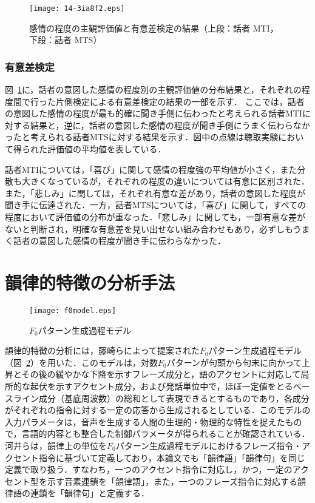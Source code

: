\documentclass[japanese]{jnlp_1.3b}
\begin{document}
\begin{figure}[b]
\begin{center}
    \texttt{[image: 14-3ia8f2.eps]}
\end{center}
\caption{感情の程度の主観評価値と有意差検定の結果（上段：話者 MTI，下段：話者 MTS）}
\label{mos}
\end{figure}

    \subsubsection{有意差検定}
図~\ref{mos}に，話者の意図した感情の程度別の主観評価値の分布結果と，それぞれの程度間で行った片側検定による有意差検定の結果の一部を示す．
ここでは，話者の意図した感情の程度が最も的確に聞き手側に伝わったと考えられる話者MTIに対する結果と，逆に，話者の意図した感情の程度が聞き手側にうまく伝わらなかったと考えられる話者MTSに対する結果を示す．図中の点線は聴取実験において得られた評価値の平均値を表している．

話者MTIについては，「喜び」に関して感情の程度強の平均値が小さく，また分散も大きくなっているが，それぞれの程度の違いについては有意に区別された．また，「悲しみ」に関しては，それぞれ有意な差があり，話者の意図した程度が聞き手に伝達された．一方，話者MTSについては，「喜び」に関して，すべての程度において評価値の分布が重なった．「悲しみ」に関しても，一部有意な差がないと判断され，明確な有意差を見い出せない組み合わせもあり，必ずしもうまく話者の意図した感情の程度が聞き手に伝わらなかった．


\section{韻律的特徴の分析手法}\label{ln}


\begin{figure}[b]
\begin{center}
    \texttt{[image: f0model.eps]}
\end{center}
\caption{$F_0$パターン生成過程モデル}
\label{model}
\end{figure}

韻律的特徴の分析には，藤崎らによって提案された$F_0$パターン生成過程モデル（図~\ref{model}）\cite{Fuji3}を用いた．このモデルは，対数$F_0$パターンが句頭から句末に向かって上昇とその後の緩やかな下降を示すフレーズ成分と，語のアクセントに対応して局所的な起伏を示すアクセント成分，および発話単位中で，ほぼ一定値をとるベースライン成分（基底周波数）の総和として表現できるとするものであり，各成分がそれぞれの指令に対する一定の応答から生成されるとしている．このモデルの入力パラメータは，音声を生成する人間の生理的・物理的な特性を捉えたもので，言語的内容とも整合した制御パラメータが得られることが確認されている．河井らは，韻律上の単位を$F_0$パターン生成過程モデルにおけるフレーズ指令・アクセント指令に基づいて定義しており\cite{kawa}，本論文でも「韻律語」「韻律句」を同じ定義で取り扱う．すなわち，一つのアクセント指令に対応し，かつ，一定のアクセント型を示す音素連鎖を「韻律語」，また，一つのフレーズ指令に対応する韻律語の連鎖を「韻律句」と定義する．
\end{document}
